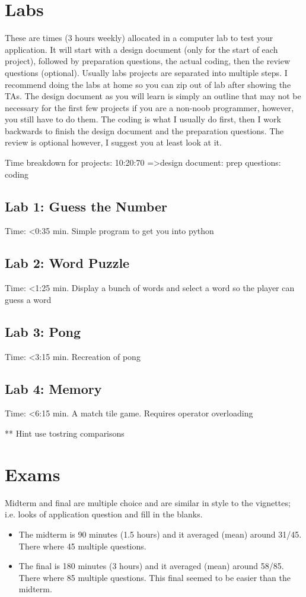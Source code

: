 \documentclass[12pt]{article}
\begin{document}
\section{Labs}
These are times (3 hours weekly) allocated in a computer lab to test your application. It will start with a design document (only for the start of each project), followed by preparation questions, the actual coding, then the review questions (optional). Usually labs projects are separated into multiple steps. I recommend doing the labs at home so you can zip out of lab after showing the TAs. The design document as you will learn is simply an outline that may not be necessary for the first few projects if you are a non-noob programmer, however, you still have to do them. The coding is what I usually do first, then I work backwards to finish the design document and the preparation questions. The review is optional however, I suggest you at least look at it. 

Time breakdown for projects: 10:20:70 =\textgreater design document: prep questions: coding
\subsection{Lab 1: Guess the Number}
Time: \textless 0:35 min.
Simple program to get you into python
\subsection{Lab 2: Word Puzzle}
Time: \textless 1:25 min.
Display a bunch of words and select a word so the player can guess a word
\subsection{Lab 3: Pong}
Time: \textless 3:15 min.
Recreation of pong
\subsection{Lab 4: Memory}
Time: \textless 6:15 min.
A match tile game. Requires operator overloading

** Hint use tostring comparisons

\section{Exams}
Midterm and final are multiple choice and are similar in style to the vignettes; i.e. looks of application question and fill in the blanks. 

\begin{itemize}
  \item The midterm is 90 minutes (1.5 hours) and it averaged (mean) around 31/45. There where 45 multiple questions.
  \item The final is 180 minutes (3 hours) and it averaged (mean) around 58/85. There where 85 multiple questions. This final seemed to be easier than the midterm. 
\end{itemize}
\end{document}
